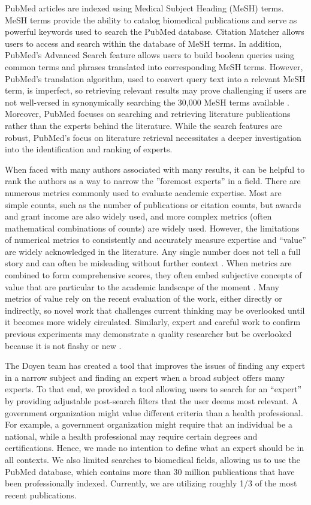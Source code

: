 PubMed articles are indexed using Medical Subject Heading (MeSH) terms. MeSH terms provide the ability to catalog biomedical publications and serve as powerful keywords used to search the PubMed database. Citation Matcher allows users to access and search within the database of MeSH terms.  In addition, PubMed’s Advanced Search feature allows users to build boolean queries using common terms and phrases translated into corresponding MeSH terms. However, PubMed’s translation algorithm, used to convert query text into a relevant MeSH term, is imperfect, so retrieving relevant results may prove challenging if users are not well-versed in synonymically searching the 30,000 MeSH terms available \cite{ref-pubmed-updated}. Moreover, PubMed focuses on searching and retrieving literature publications rather than the experts behind the literature. While the search features are robust, PubMed's focus on literature retrieval necessitates a deeper investigation into the identification and ranking of experts. 

When faced with many authors associated with many results, it can be helpful to rank the authors as a way to narrow the ''foremost experts'' in a field. There are numerous metrics commonly used to evaluate academic expertise. Most are simple counts, such as the number of publications or citation counts, but awards and grant income are also widely used, and more complex metrics (often mathematical combinations of counts) are widely used. However, the limitations of numerical metrics to consistently and accurately measure expertise and ``value'' are widely acknowledged in the literature. Any single number does not tell a full story and can often be misleading without further context \cite{ref-metrics-stack-overflow}. When metrics are combined to form comprehensive scores, they often embed subjective concepts of value that are particular to the academic landscape of the moment \cite{ref-metrics-neoliberalism}. Many metrics of value rely on the recent evaluation of the work, either directly or indirectly, so novel work that challenges current thinking may be overlooked until it becomes more widely circulated. Similarly, expert and careful work to confirm previous experiments may demonstrate a quality researcher but be overlooked because it is not flashy or new \cite{ref-metrics-games-academics-play}.

The Doyen team has created a tool that improves the issues of finding any expert in a narrow subject and finding an expert when a broad subject offers many experts. To that end, we provided a tool allowing users to search for an ``expert'' by providing adjustable post-search filters that the user deems most relevant. A government organization might value different criteria than a health professional. For example, a government organization might require that an individual be a national, while a health professional may require certain degrees and certifications. Hence, we made no intention to define what an expert should be in all contexts. We also limited searches to biomedical fields, allowing us to use the PubMed database, which contains more than 30 million publications that have been professionally indexed. Currently, we are utilizing roughly 1/3 of the most recent publications.


